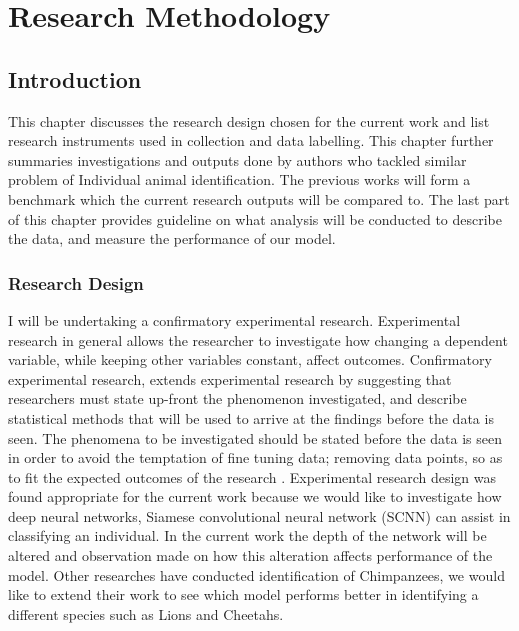 %
%
%

\chapter{Research Methodology}
\section{Introduction}
This chapter discusses the research design chosen for the current work and list research instruments used in collection and data labelling. This chapter further summaries investigations and outputs done by authors who tackled similar problem of Individual animal identification. The previous works will form a benchmark which the current research outputs will be compared to. The last part of this chapter provides guideline on what analysis will be conducted to describe the data, and measure the performance of our model.
\subsection{Research Design}
I will be undertaking a confirmatory experimental research. Experimental research in general allows the researcher to investigate how changing a dependent variable, while keeping other variables constant, affect outcomes. Confirmatory experimental research, extends experimental research by suggesting that researchers must state up-front the phenomenon investigated, and describe statistical methods that will be used to arrive at the findings before the data is seen. The phenomena to be investigated should be stated before the data is seen in order to avoid the temptation of fine tuning data; removing data points, so as to fit the expected outcomes of the research \cite{wagenmakers2012agenda}. Experimental research design was found appropriate for the current work because we would like to investigate how deep neural networks, Siamese convolutional neural network (SCNN) can assist in classifying an individual. In the current work the depth of the network will be altered and observation made on how this alteration affects performance of the model. Other researches have conducted identification of Chimpanzees, we would like to extend their work to see which model performs better in identifying a different species such as Lions and Cheetahs.   
